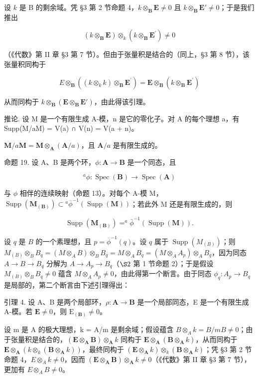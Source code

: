 设 \(k\) 是 B 的剩余域。凭 §3 第 2 节命题 4，\(k \otimes_{\mathbf{B}} \mathbf{E} \neq 0\) 且 \(k \otimes_{\mathbf{B}} \mathbf{E}' \neq 0\)；于是我们推出

\[
(k \otimes_ {\mathbf {B}} \mathbf {E}) \otimes_ {k} (k \otimes_ {\mathbf {B}} \mathbf {E} ^ {\prime}) \neq 0
\]

（《代数》第 II 章 §3 第 7 节）。但由于张量积是结合的（同上，§3 第 8 节），该张量积同构于

\[
E \otimes_ {\mathbf {B}} ((k \otimes_ {k} k) \otimes_ {\mathbf {B}} \mathbf {E} ^ {\prime}) = \mathbf {E} \otimes_ {\mathbf {B}} (k \otimes_ {\mathbf {B}} \mathbf {E} ^ {\prime})
\]

从而同构于 \(k \otimes_{\mathbf{B}} (\mathbf{E} \otimes_{\mathbf{B}} \mathbf{E}')\)，由此得该引理。

推论. 设 M 是一个有限生成 A-模，n 是它的零化子。对 A 的每个理想 a，有 Supp(M/aM) = V(a) ∩ V(n) = V(a + n)。

\(\mathbf{M} / a\mathbf{M} = \mathbf{M}\otimes_{\mathbf{A}}(\mathbf{A} / a)\)，且 \(\mathbf{A} / a\) 是有限生成的。

命题 19. 设 A、B 是两个环，\(\phi: \mathbf{A} \to \mathbf{B}\) 是一个同态，且

\[
^ {a} \phi : \operatorname{Spec} (\mathbf {B}) \rightarrow \operatorname{Spec} (\mathbf {A})
\]

与 \(\phi\) 相伴的连续映射（命题 13）。对每个 A-模 M，\(\operatorname{Supp}(\mathbf{M}_{(\mathbf{B})}) \subset {}^a\overline{\phi}^{-1}(\operatorname{Supp}(\mathbf{M}))\)；若此外 M 还是有限生成的，则

\[
\operatorname{Supp} (\mathbf {M} _ {(\mathbf {B})}) = ^ {a} \bar {\phi} ^ {- 1} (\operatorname{Supp} (\mathbf {M})).
\]

设 \(q\) 是 \(B\) 的一个素理想，且 \(p = \overline{\phi}^{-1}(q)\)。设 \(q\) 属于 \(\operatorname{Supp}(M_{(B)})\)；则 \(M_{(B)} \otimes_B B_q = (M \otimes_A B) \otimes_B B_q = M \otimes_A B_q = (M \otimes_A A_p) \otimes_A B_q\)，因为同态 \(A \to B \to B_q\) 分解为 \(A \to A_p \to B_q\)（\(\S 2\) 第 1 节命题 2）；于是假设 \(M_{(B)} \otimes_B B_q \neq 0\) 蕴含 \(M \otimes_A A_p \neq 0\)，由此得第一个断言。由于同态 \(\phi_q: A_p \to B_q\) 是局部的，第二个断言由下述引理得出：

引理 4. 设 A、B 是两个局部环，\(\rho: \mathbf{A} \to \mathbf{B}\) 是一个局部同态，E 是一个有限生成 A-模。若 \(\mathbf{E} \neq 0\)，则 \(\mathrm{E}_{(\mathbf{B})} \neq 0\)。

设 m 是 A 的极大理想，k = A/m 是剩余域；假设蕴含 \(B \otimes_{A} k = B/mB \neq 0\)；由于张量积是结合的，\((\mathbf{E} \otimes_{\mathbf{A}} \mathbf{B}) \otimes_{\mathbf{A}} k\) 同构于 \(\mathbf{E} \otimes_{\mathbf{A}} (\mathbf{B} \otimes_{\mathbf{A}} k)\)，从而同构于 \(\mathbf{E} \otimes_{\mathbf{A}} (k \otimes_{k} (\mathbf{B} \otimes_{\mathbf{A}} k))\)，最终同构于 \((\mathbf{E} \otimes_{\mathbf{A}} k) \otimes_{k} (\mathbf{B} \otimes_{\mathbf{A}} k)\)；凭 §3 第 2 节命题 4，\(E \otimes_{A} k \neq 0\)，因而 \((\mathbf{E} \otimes_{\mathbf{A}} \mathbf{B}) \otimes_{\mathbf{A}} k \neq 0\)（《代数》第 II 章 §3 第 7 节），更加有 \(E \otimes_{A} B \neq 0\)。

